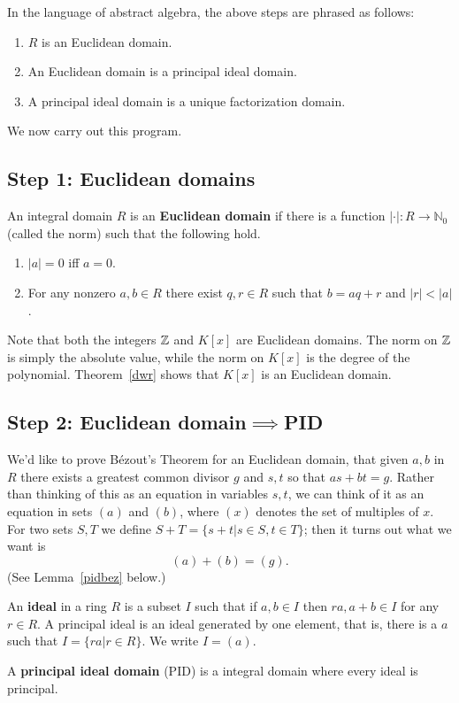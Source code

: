In the language of abstract algebra, the above steps are phrased as follows:
\begin{enumerate}
\item $R$ is an Euclidean domain.
\item An Euclidean domain is a principal ideal domain.
\item A principal ideal domain is a unique factorization domain.
\end{enumerate}
We now carry out this program.

\subsection{Step 1: Euclidean domains}
\begin{df}
An integral domain $R$ is an \textbf{Euclidean domain} if there is a function $|\cdot |:R\to \mathbb N_0$ (called the norm) such that the following hold.
\begin{enumerate}
\item $|a|=0$ iff $a=0$.
\item For any nonzero $a,b\in R$ there exist $q,r\in R$ such that $b=aq+r$ and $|r|<|a|$.
\end{enumerate}
\end{df}
Note that both the integers $\mathbb{Z}$ and $K[x]$ are Euclidean domains. The norm on $\mathbb{Z}$ is simply the absolute value, while the norm on $K[x]$ is the degree of the polynomial. Theorem~\ref{dwr} shows that $K[x]$ is an Euclidean domain.

\subsection{Step 2: Euclidean domain$\implies$PID}
We'd like to prove B\'ezout's Theorem for an Euclidean domain, that given $a,b$ in $R$ there exists a greatest common divisor $g$ and $s,t$ so that $as+bt=g$. Rather than thinking of this as an equation in variables $s,t$, we can think of it as an equation in sets $(a)$ and $(b)$, where $(x)$ denotes the set of multiples of $x$. For two sets $S,T$ we define $S+T=\{s+t|s\in S,t\in T\}$; then it turns out what we want is
\[
(a)+(b)=(g).
\]
(See Lemma~\ref{pidbez} below.)

\begin{df}
An \textbf{ideal} in a ring $R$ is a subset $I$ such that if $a,b\in I$ then $ra,a+b\in I$ for any $r\in R$. A principal ideal is an ideal generated by one element, that is, there is a $a$ such that $I=\{ra|r\in R\}$. We write $I=(a)$.

A \textbf{principal ideal domain} (PID) is a integral domain where every ideal is principal.
\end{df}

